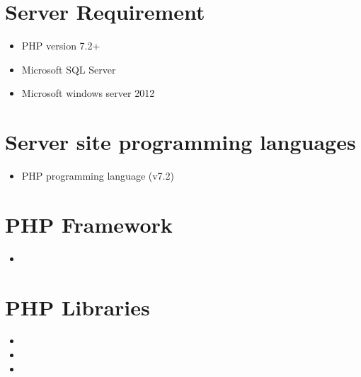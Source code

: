 \documentclass[letterpaper,10pt,english,openany,oneside]{sphinxmanual}
\begin{document}
\section{Server Requirement}
\label{\detokenize{technology/technology:server-requirement}}\begin{itemize}
\item {} 
\sphinxAtStartPar
PHP version 7.2+

\item {} 
\sphinxAtStartPar
Microsoft SQL Server

\item {} 
\sphinxAtStartPar
Microsoft windows server 2012

\end{itemize}


\section{Server site programming languages}
\label{\detokenize{technology/technology:server-site-programming-languages}}\begin{itemize}
\item {} 
\sphinxAtStartPar
PHP programming language (v7.2)

\end{itemize}


\section{PHP Framework}
\label{\detokenize{technology/technology:php-framework}}\begin{itemize}
\item {} 
\sphinxAtStartPar
{}

\end{itemize}


\section{PHP Libraries}
\label{\detokenize{technology/technology:php-libraries}}\begin{itemize}
\item {} 
\sphinxAtStartPar
{}

\item {} 
\sphinxAtStartPar
{}

\item {} 
\sphinxAtStartPar
{}

\end{itemize}
\end{document}
